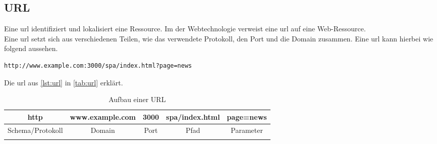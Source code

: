 \subsection{URL}
\label{sec:url}
Eine \ac{url} identifiziert und lokalisiert eine Ressource. Im der Webtechnologie verweist eine \ac{url} auf eine Web-Ressource. \\
Eine \ac{url} setzt sich aus verschiedenen Teilen, wie das verwendete Protokoll, den Port und die Domain zusammen. Eine \ac{url} kann hierbei wie folgend aussehen.

\begin{lstlisting}[style=jcr, caption=Eine URL, label=lst:url]
http://www.example.com:3000/spa/index.html?page=news
\end{lstlisting}

Die \ac{url} aus \autoref{lst:url} in \autoref{tab:url} erklärt.

\begin{longtable}{|c|c|c|c|c|} 
	
	
	\hline 
	http & www.example.com & 3000 & spa/index.html & page=news\\ 
	
	\hline 
	Schema/Protokoll & Domain & Port & Pfad & Parameter\\
	\hline
	\caption{Aufbau einer URL}\label{tab:url}
\end{longtable}